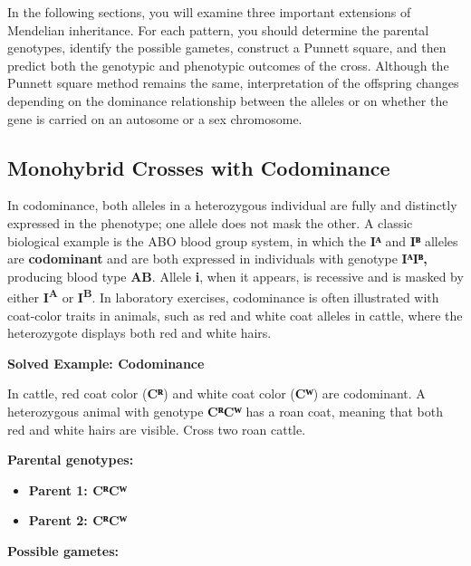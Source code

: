 \documentclass[
  letterpaper,
  DIV=11,
  numbers=noendperiod]{scrreprt}
\begin{document}
In the following sections, you will examine three important extensions
of Mendelian inheritance. For each pattern, you should determine the
parental genotypes, identify the possible gametes, construct a Punnett
square, and then predict both the genotypic and phenotypic outcomes of
the cross. Although the Punnett square method remains the same,
interpretation of the offspring changes depending on the dominance
relationship between the alleles or on whether the gene is carried on an
autosome or a sex chromosome.

\subsection{\texorpdfstring{\textbf{Monohybrid Crosses with
Codominance}}{Monohybrid Crosses with Codominance}}\label{monohybrid-crosses-with-codominance}

In codominance, both alleles in a heterozygous individual are fully and
distinctly expressed in the phenotype; one allele does not mask the
other. A classic biological example is the ABO blood group system, in
which the \textbf{Iᴬ} and \textbf{Iᴮ} alleles are \textbf{codominant}
and are both expressed in individuals with genotype \textbf{IᴬIᴮ,}
producing blood type \textbf{AB}. Allele \textbf{i}, when it appears, is
recessive and is masked by either \textbf{I\textsuperscript{A}} or
\textbf{I\textsuperscript{B}}. In laboratory exercises, codominance is
often illustrated with coat-color traits in animals, such as red and
white coat alleles in cattle, where the heterozygote displays both red
and white hairs.

\textbf{Solved Example: Codominance}

In cattle, red coat color (\textbf{Cᴿ}) and white coat color
(\textbf{Cᵂ}) are codominant. A heterozygous animal with genotype
\textbf{CᴿCᵂ} has a roan coat, meaning that both red and white hairs are
visible. Cross two roan cattle.

\textbf{Parental genotypes:}

\begin{itemize}
\item
  \textbf{Parent 1: CᴿCᵂ}
\item
  \textbf{Parent 2: CᴿCᵂ}
\end{itemize}

\textbf{Possible gametes:}
\end{document}
